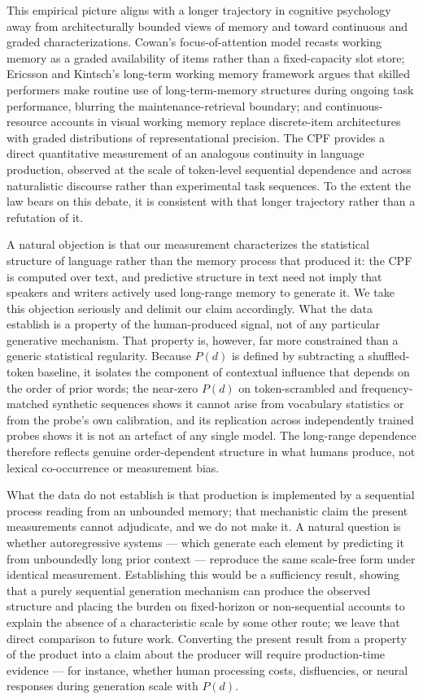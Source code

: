 \documentclass[11pt]{article}
\begin{document}
This empirical picture aligns with a longer trajectory in cognitive psychology away from
architecturally bounded views of memory and toward continuous and graded characterizations.
Cowan's focus-of-attention model \citep{cowan2001magical} recasts working memory as a graded
availability of items rather than a fixed-capacity slot store; Ericsson and Kintsch's
long-term working memory framework \citep{ericsson1995longterm} argues that skilled
performers make routine use of long-term-memory structures during ongoing task performance,
blurring the maintenance-retrieval boundary; and continuous-resource accounts in visual
working memory \citep{ma2014changing} replace discrete-item architectures with graded
distributions of representational precision. The CPF provides a direct
quantitative measurement of an analogous continuity in language production, observed at the
scale of token-level sequential dependence and across naturalistic discourse rather than
experimental task sequences. To the extent the law bears on this debate, it is consistent
with that longer trajectory rather than a refutation of it.

A natural objection is that our measurement characterizes the statistical structure of
language rather than the memory process that produced it: the CPF is computed
over text, and predictive structure in text need not imply that speakers and writers actively
used long-range memory to generate it. We take this objection seriously and delimit our claim
accordingly. What the data establish is a property of the human-produced signal, not of any
particular generative mechanism. That property is, however, far more constrained than a generic
statistical regularity. Because $P(d)$ is defined by subtracting a shuffled-token baseline, it
isolates the component of contextual influence that depends on the order of prior words; the
near-zero $P(d)$ on token-scrambled and frequency-matched synthetic sequences shows it cannot
arise from vocabulary statistics or from the probe's own calibration, and its replication across
independently trained probes shows it is not an artefact of any single model. The long-range
dependence therefore reflects genuine order-dependent structure in what humans produce, not
lexical co-occurrence or measurement bias.

What the data do not establish is that production is implemented by a sequential process reading
from an unbounded memory; that mechanistic claim the present measurements cannot adjudicate, and
we do not make it. A natural question is whether autoregressive systems --- which generate each element
by predicting it from unboundedly long prior context --- reproduce the same scale-free form under
identical measurement. Establishing this would be a sufficiency result, showing that a purely
sequential generation mechanism can produce the observed structure and placing the burden on
fixed-horizon or non-sequential accounts to explain the absence of a characteristic scale by some
other route; we leave that direct comparison to future work.
Converting the present result from a property of the product into a claim about the producer
will require production-time evidence --- for instance, whether human processing costs,
disfluencies, or neural responses during generation scale with $P(d)$.
\end{document}
